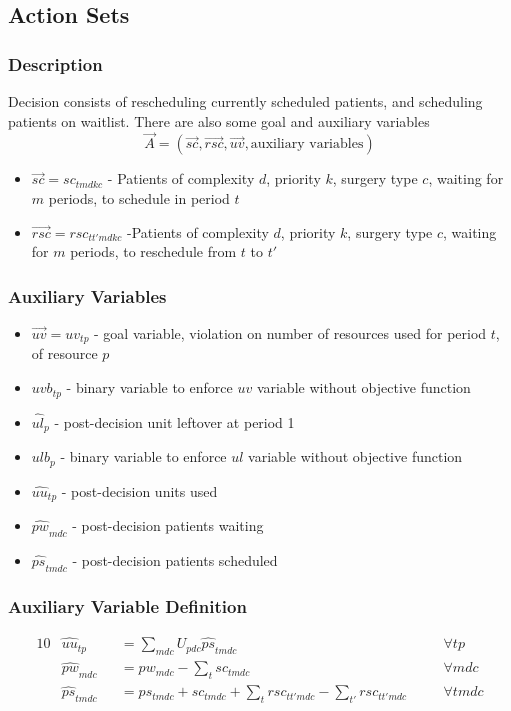 \subsection{Action Sets}
\subsubsection{Description}
Decision consists of rescheduling currently scheduled patients, and scheduling patients on waitlist. There are also some goal and auxiliary variables
\[  \vec{A} = (\vec{sc}, \vec{rsc}, \vec{uv}, \text{auxiliary variables}) \] 
\begin{itemize}
	\item $\vec{sc} = sc_{tmdkc}$ - Patients of complexity $d$, priority $k$,  surgery type $c$, waiting for $m$ periods, to schedule in period $t$
	\item $\vec{rsc} = rsc_{tt'mdkc}$ -Patients of complexity $d$, priority $k$, surgery type $c$, waiting for $m$ periods, to reschedule from $t$ to $t'$
\end{itemize}

\subsubsection{Auxiliary Variables}
\begin{itemize}
	\item $\vec{uv} = uv_{tp}$ - goal variable, violation on number of resources used for period $t$, of resource $p$
	\item $uvb_{tp}$ - binary variable to enforce $uv$ variable without objective function
	\item $\hat{ul}_{p}$ - post-decision unit leftover at period 1
	\item $ulb_{p}$ - binary variable to enforce $ul$ variable without objective function
	\item $\hat{uu}_{tp}$ - post-decision units used
	\item $\hat{pw}_{mdc}$ - post-decision patients waiting
	\item $\hat{ps}_{tmdc}$ - post-decision patients scheduled
\end{itemize}
\subsubsection{Auxiliary Variable Definition}
\label{auxiliary constraints}
\begin{alignat}{10}
	& \hat{uu}_{tp} 
	&& =  \sum_{mdc} U_{pdc} \hat{ps}_{tmdc} \quad
	&& \forall tp \\ 
	& \hat{pw}_{mdc} 
	&& = pw_{mdc} - \sum_{t} sc_{tmdc} \quad 
	&& \forall mdc \\ 
	& \hat{ps}_{tmdc} 
	&& = ps_{tmdc} + sc_{tmdc} + 
	\sum_{t} rsc_{tt'mdc} - \sum_{t'} rsc_{tt'mdc} \quad 
	&& \forall tmdc
\end{alignat}

